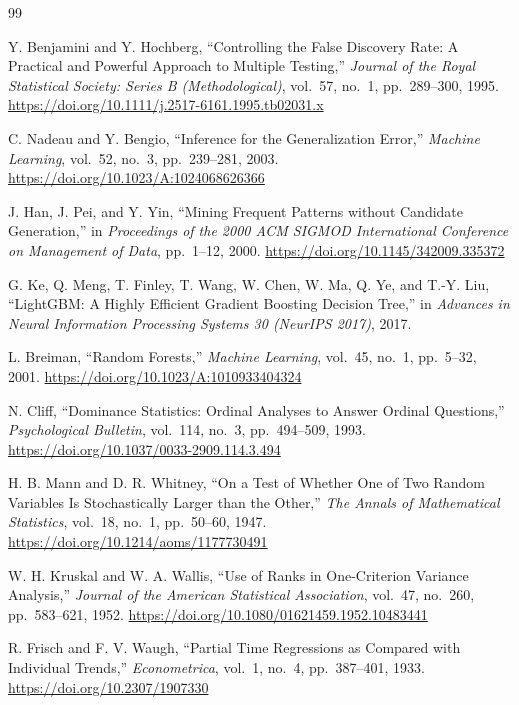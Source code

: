 \begin{thebibliography}{99}

Y. Benjamini and Y. Hochberg, ``Controlling the False Discovery Rate: A Practical and Powerful Approach to Multiple Testing,'' \emph{Journal of the Royal Statistical Society: Series B (Methodological)}, vol.~57, no.~1, pp.~289--300, 1995. \url{https://doi.org/10.1111/j.2517-6161.1995.tb02031.x}

C. Nadeau and Y. Bengio, ``Inference for the Generalization Error,'' \emph{Machine Learning}, vol.~52, no.~3, pp.~239--281, 2003. \url{https://doi.org/10.1023/A:1024068626366}

J. Han, J. Pei, and Y. Yin, ``Mining Frequent Patterns without Candidate Generation,'' in \emph{Proceedings of the 2000 ACM SIGMOD International Conference on Management of Data}, pp.~1--12, 2000. \url{https://doi.org/10.1145/342009.335372}

G. Ke, Q. Meng, T. Finley, T. Wang, W. Chen, W. Ma, Q. Ye, and T.-Y. Liu, ``LightGBM: A Highly Efficient Gradient Boosting Decision Tree,'' in \emph{Advances in Neural Information Processing Systems 30 (NeurIPS 2017)}, 2017.

L. Breiman, ``Random Forests,'' \emph{Machine Learning}, vol.~45, no.~1, pp.~5--32, 2001. \url{https://doi.org/10.1023/A:1010933404324}

N. Cliff, ``Dominance Statistics: Ordinal Analyses to Answer Ordinal Questions,'' \emph{Psychological Bulletin}, vol.~114, no.~3, pp.~494--509, 1993. \url{https://doi.org/10.1037/0033-2909.114.3.494}

H. B. Mann and D. R. Whitney, ``On a Test of Whether One of Two Random Variables Is Stochastically Larger than the Other,'' \emph{The Annals of Mathematical Statistics}, vol.~18, no.~1, pp.~50--60, 1947. \url{https://doi.org/10.1214/aoms/1177730491}

W. H. Kruskal and W. A. Wallis, ``Use of Ranks in One-Criterion Variance Analysis,'' \emph{Journal of the American Statistical Association}, vol.~47, no.~260, pp.~583--621, 1952. \url{https://doi.org/10.1080/01621459.1952.10483441}

R. Frisch and F. V. Waugh, ``Partial Time Regressions as Compared with Individual Trends,'' \emph{Econometrica}, vol.~1, no.~4, pp.~387--401, 1933. \url{https://doi.org/10.2307/1907330}


\end{thebibliography}

